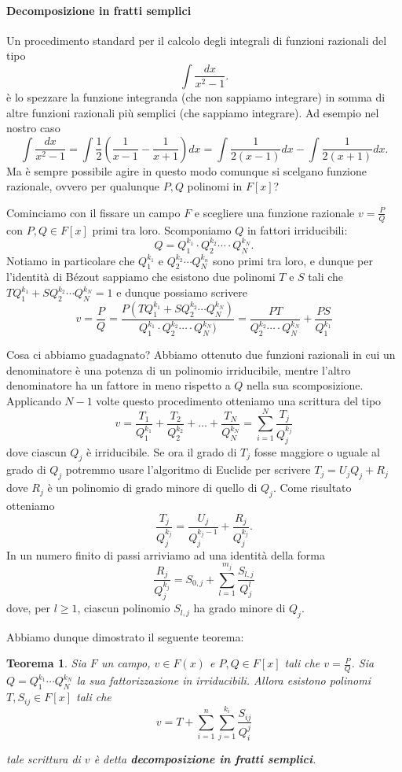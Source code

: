 \documentclass[10pt,oneside]{article}
\theoremstyle{definition}
\theoremstyle{plain}
\newtheorem{teo}{Teorema}
\theoremstyle{definition}
\theoremstyle{plain}
\theoremstyle{plain}
\begin{document}
\paragraph{Decomposizione in fratti semplici}
Un procedimento standard per il calcolo degli integrali di funzioni razionali del tipo
\[\int \frac{dx}{x^2-1}.\]
è lo spezzare la funzione integranda (che non sappiamo integrare) in somma di altre funzioni razionali più semplici (che sappiamo integrare). Ad esempio nel nostro caso
\[\int \frac{dx}{x^2-1}= \int \frac{1}{2} \left( \frac{1}{x-1}-\frac{1}{x+1}\right)dx = \int \frac{1}{2(x-1)}dx - \int \frac{1}{2(x+1)}dx. \]
Ma è sempre possibile agire in questo modo comunque si scelgano funzione razionale, ovvero per qualunque $P,Q$ polinomi in $F[x]$?

Cominciamo con il fissare un campo $F$ e scegliere una funzione razionale $v=\frac{P}{Q}$ con $P,Q\in F[x]$ primi tra loro. Scomponiamo $Q$ in fattori irriducibili:
\[Q=Q_1^{k_1}\cdot Q_2^{k_2} \cdots \cdot Q_N^{k_N}. \]
Notiamo in particolare che $Q_1^{k_1}$ e $Q_2^{k_2}\cdots Q_N^{k_n}$ sono primi tra loro, e dunque per l'identità di Bézout sappiamo che esistono due polinomi $T$ e $S$ tali che $TQ_1^{k_1}+SQ_2^{k_2}\cdots Q_N^{k_N}=1$ e dunque possiamo scrivere
\[v= \frac{P}{Q}=\frac{P(TQ_1^{k_1}+SQ_2^{k_2}\cdots Q_N^{k_N})}{Q_1^{k_1}\cdot Q_2^{k_2} \cdots \cdot Q_N^{k_N})}= \frac{PT}{Q_2^{k_2} \cdots \cdot Q_N^{k_N}}+\frac{PS}{Q_1^{k_1}} \]

Cosa ci abbiamo guadagnato? Abbiamo ottenuto due funzioni razionali in cui un denominatore è una potenza di un polinomio irriducibile, mentre l'altro denominatore ha un fattore in meno rispetto a $Q$ nella sua scomposizione. Applicando $N-1$ volte questo procedimento otteniamo una scrittura del tipo
\[v=\frac{T_1}{Q_1^{k_1}}+\frac{T_2}{Q_2^{k_2}}+\dots+\frac{T_N}{Q_N^{k_N}}=\sum_{i=1}^N \frac{T_j}{Q_j^{k_j}} \]
dove ciascun $Q_j$ è irriducibile. Se ora il grado di $T_j$ fosse maggiore o uguale al grado di $Q_j$ potremmo usare l'algoritmo di Euclide per scrivere $T_j=U_jQ_j+R_j$ dove $R_j$ è un polinomio di grado minore di quello di $Q_j$. Come risultato otteniamo
\[\frac{T_j}{Q_j^{k_j}}= \frac{U_j}{Q_j^{k_j-1}}+\frac{R_j}{Q_j^{k_j}}. \]
In un numero finito di passi arriviamo ad una identità della forma
\[\frac{R_j}{Q_j^{k_j}}= S_{0,j}+\sum_{l=1}^{m_j} \frac{S_{l,j}}{Q_j^l} \]
dove, per $l \ge 1$, ciascun polinomio $S_{l,j}$ ha grado minore di $Q_j$. 

Abbiamo dunque dimostrato il seguente teorema:

\begin{teo}\label{teo:fratti}
Sia $F$ un campo, $v \in F(x)$ e $P,Q \in F[x]$ tali che $v=\frac{P}{Q}$. Sia $Q=Q_1^{k_1}\cdots Q_N^{k_N}$ la sua fattorizzazione in irriducibili. Allora esistono polinomi $T,S_{ij} \in F[x]$ tali che
\[v=T+\sum_{i=1}^n\sum_{j=1}^{k_i} \frac{S_{ij}}{Q_i^{j}} \]

tale scrittura di $v$ è detta \textbf{decomposizione in fratti semplici}.
\end{teo}
\end{document}

